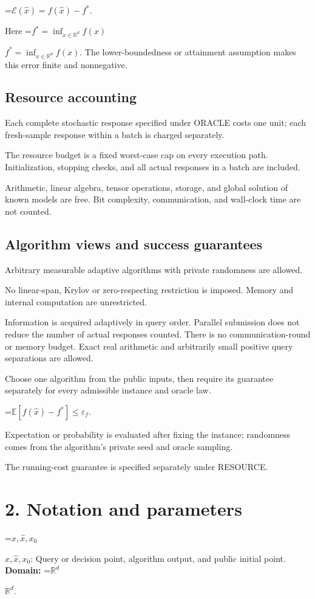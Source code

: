 \documentclass[10pt,a4paper]{article}
\newcommand{\AtlasMath}[1]{\par\begingroup\centering\setbox0=\hbox{$\displaystyle #1$}\ifdim\wd0>1.4\linewidth\typeout{ATLAS WIDE FORMULA: \the\wd0}\fi\ifdim\wd0>\linewidth\resizebox{\linewidth}{!}{\box0}\else\box0\fi\par\endgroup}
\newcommand{\AtlasInlineMath}[1]{\begingroup\setbox0=\hbox{$#1$}\ifdim\wd0>.4\linewidth\endgroup\AtlasMath{#1}\else\endgroup$#1$\fi}
\begin{document}
\AtlasMath{\mathcal{E}(\widehat{x})=f(\widehat{x})-f^*.}


Here \AtlasInlineMath{f^*=\inf_{x\in \mathbb{R}^d}f(x)}. The lower-boundedness or attainment assumption makes this error finite and nonnegative.

\subsection{Resource accounting}
Each complete stochastic response specified under ORACLE costs one unit; each fresh-sample response within a batch is charged separately.

The resource budget is a fixed worst-case cap on every execution path. Initialization, stopping checks, and all actual responses in a batch are included.

Arithmetic, linear algebra, tensor operations, storage, and global solution of known models are free. Bit complexity, communication, and wall-clock time are not counted.

\subsection{Algorithm views and success guarantees}
Arbitrary measurable adaptive algorithms with private randomness are allowed.

No linear-span, Krylov or zero-respecting restriction is imposed. Memory and internal computation are unrestricted.

Information is acquired adaptively in query order. Parallel submission does not reduce the number of actual responses counted. There is no communication-round or memory budget. Exact real arithmetic and arbitrarily small positive query separations are allowed.

Choose one algorithm from the public inputs, then require its guarantee separately for every admissible instance and oracle law.


\AtlasMath{\mathbb{E}\!\left[f(\widehat{x})-f^*\right]\le \varepsilon_f.}


Expectation or probability is evaluated after fixing the instance; randomness comes from the algorithm's private seed and oracle sampling.

The running-cost guarantee is specified separately under RESOURCE.

\section{2. Notation and parameters}
\AtlasInlineMath{x,\widehat{x},x_0}: Query or decision point, algorithm output, and public initial point. \textbf{Domain:} \AtlasInlineMath{\mathbb{R}^d}.
\end{document}
